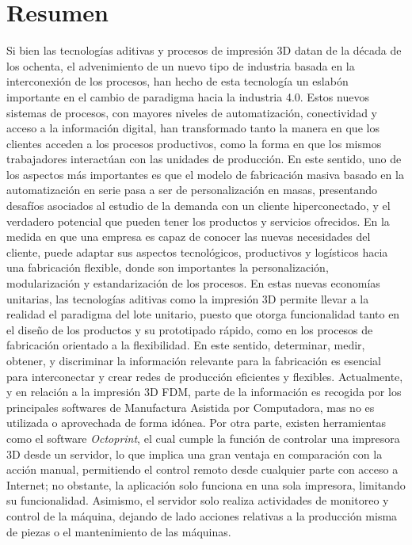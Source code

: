 \section{Resumen}

\label{intro:resumen}
Si bien las tecnologías aditivas y procesos de impresión 3D datan de la década de los ochenta, el advenimiento de un nuevo tipo de industria basada en la interconexión de los procesos, han hecho de esta tecnología un eslabón importante en el cambio de paradigma hacia la industria 4.0. Estos nuevos sistemas de procesos, con mayores niveles de automatización, conectividad y acceso a la información digital, han transformado tanto la manera en que los clientes acceden a los procesos productivos, como la forma en que los mismos trabajadores interactúan con las unidades de producción. En este sentido, uno de los aspectos más importantes es que el modelo de fabricación masiva basado en la automatización en serie pasa a ser de personalización en masas, presentando desafíos asociados al estudio de la demanda con un cliente hiperconectado, y el verdadero potencial que pueden tener los productos y servicios ofrecidos. En la medida en que una empresa es capaz de conocer las nuevas necesidades del cliente, puede adaptar sus aspectos tecnológicos, productivos y logísticos hacia una fabricación flexible, donde son importantes la personalización, modularización y estandarización de los procesos. En estas nuevas economías unitarias, las tecnologías aditivas como la impresión 3D permite llevar a la realidad el paradigma del lote unitario, puesto que otorga funcionalidad tanto en el diseño de los productos y su prototipado rápido, como en los procesos de fabricación orientado a la flexibilidad.  En este sentido, determinar, medir, obtener, y discriminar la información relevante para la fabricación es esencial para interconectar y crear redes de producción eficientes y flexibles. Actualmente, y en relación a la impresión 3D FDM, parte de la información es recogida por los principales softwares de Manufactura Asistida por Computadora, mas no es utilizada o aprovechada de forma idónea. Por otra parte, existen herramientas como el software \textit{Octoprint}, el cual cumple la función de controlar una impresora 3D desde un servidor, lo que implica una gran ventaja en comparación con la acción manual, permitiendo el control remoto desde cualquier parte con acceso a Internet; no obstante, la aplicación solo funciona en una sola impresora, limitando su funcionalidad. Asimismo, el servidor solo realiza actividades de monitoreo y control de la máquina, dejando de lado acciones relativas a la producción misma de piezas o el mantenimiento de las máquinas.       
